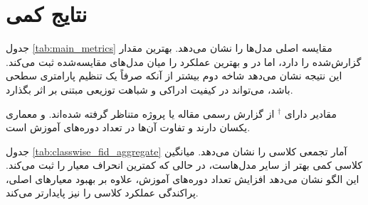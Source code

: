 \section{نتایج کمی}
جدول \ref{tab:main_metrics} مقایسه اصلی مدل‌ها را نشان می‌دهد.  بهترین مقدار  گزارش‌شده را دارد، اما  در  و  بهترین عملکرد را میان مدل‌های مقایسه‌شده ثبت می‌کند. این نتیجه نشان می‌دهد شاخه دوم  بیشتر از آنکه صرفاً یک تنظیم پارامتری سطحی باشد، می‌تواند در کیفیت ادراکی و شباهت توزیعی مبتنی بر  اثر بگذارد.

\begin{table}[htbp]
    \centering
    \caption[مقایسه کمی اصلی]{مقایسه کمی اصلی میان مدل‌های ارزیابی‌شده. معیارهای ،  و  همگی کمتر-بهتر هستند.}
    \label{tab:main_metrics}
    \begin{latin}
    \footnotesize
    \end{latin}
    \begin{minipage}{0.96\linewidth}
        \footnotesize
        مقادیر دارای $^\dagger$ از گزارش رسمی مقاله یا پروژه متناظر گرفته شده‌اند.  و  معماری یکسان دارند و تفاوت آن‌ها در تعداد دوره‌های آموزش است.
    \end{minipage}
\end{table}

جدول \ref{tab:classwise_fid_aggregate} آمار تجمعی  کلاسی را نشان می‌دهد. میانگین کلاسی  کمی بهتر از سایر مدل‌هاست، در حالی که  کمترین انحراف معیار را ثبت می‌کند. این الگو نشان می‌دهد افزایش تعداد دوره‌های آموزش، علاوه بر بهبود معیارهای اصلی، پراکندگی عملکرد کلاسی را نیز پایدارتر می‌کند.


